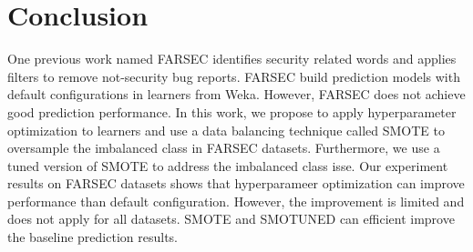 \section{Conclusion}
\label{conclusion}

One previous work named FARSEC identifies security related words and applies filters to remove not-security bug reports. FARSEC build prediction models with default configurations in learners from Weka. However, FARSEC does not achieve good prediction performance. In this work, we propose to apply hyperparameter optimization to learners and use a data balancing technique called SMOTE to oversample the imbalanced class in FARSEC datasets. Furthermore, we use a tuned version of SMOTE to address the imbalanced class isse. Our experiment results on FARSEC datasets shows that hyperparameer optimization can improve performance than default configuration. However, the improvement is limited and does not apply for all datasets. SMOTE and SMOTUNED can efficient improve the baseline prediction results.